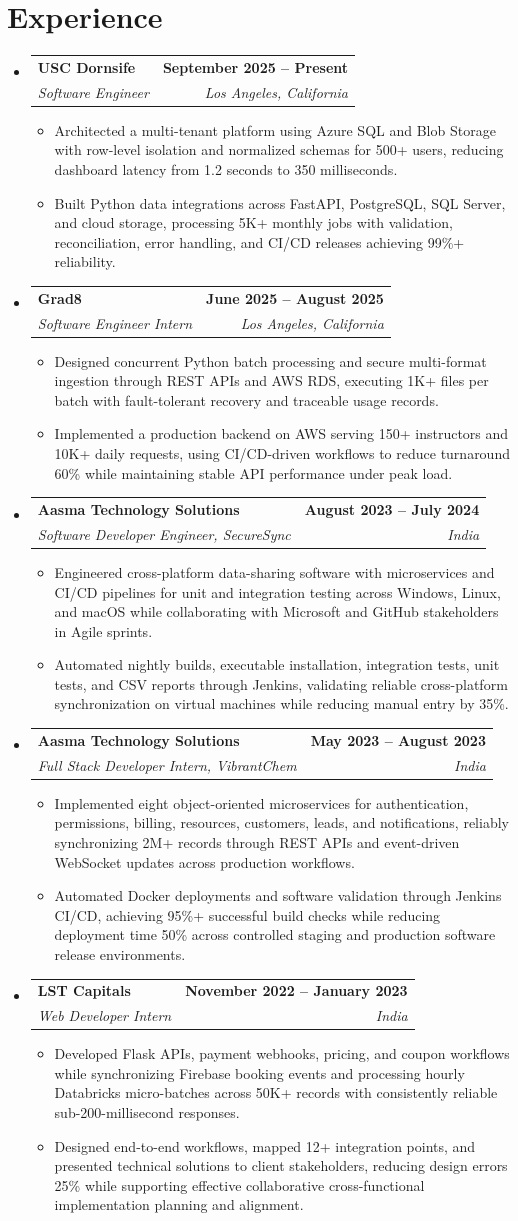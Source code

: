 \documentclass[letterpaper,10pt]{article}
\makeatletter
\newcommand{\itemTail}{\vspace{-4pt}}
\newcommand{\sectionGap}{\vspace{-8pt}}
\newcommand{\roleGap}{\vspace{2pt}}
\newcommand{\resumeItem}[1]{\item\small{{#1 \itemTail}}}
\newcommand{\resumeSubheading}[4]{\vspace{-1pt}\item\begin{tabular*}{1.0\textwidth}[t]{l@{\extracolsep{\fill}}r}\textbf{#1} & \textbf{\small #2} \\\textit{\small#3} & \textit{\small #4} \\\end{tabular*}\vspace{-2pt}}
\newcommand{\resumeSubHeadingListStart}{\begin{itemize}[leftmargin=0.0in, label={}]}
\newcommand{\resumeSubHeadingListEnd}{\end{itemize}}
\newcommand{\resumeItemListStart}{\begin{itemize}[leftmargin=0.15in,label=\textbullet,itemsep=3pt,topsep=0pt,parsep=0pt,partopsep=0pt]}
\newcommand{\resumeItemListEnd}{\end{itemize}\vspace{-4pt}}
\makeatother
\begin{document}
\section{Experience}
\resumeSubHeadingListStart
\resumeSubheading{USC Dornsife}{September 2025 -- Present}{Software Engineer}{Los Angeles, California}
\resumeItemListStart
\resumeItem{Architected a multi-tenant platform using Azure SQL and Blob Storage with row-level isolation and normalized schemas for 500+ users, reducing dashboard latency from 1.2 seconds to 350 milliseconds.}
\resumeItem{Built Python data integrations across FastAPI, PostgreSQL, SQL Server, and cloud storage, processing 5K+ monthly jobs with validation, reconciliation, error handling, and CI/CD releases achieving 99\%+ reliability.}
\resumeItemListEnd
\roleGap
\resumeSubheading{Grad8}{June 2025 -- August 2025}{Software Engineer Intern}{Los Angeles, California}
\resumeItemListStart
\resumeItem{Designed concurrent Python batch processing and secure multi-format ingestion through REST APIs and AWS RDS, executing 1K+ files per batch with fault-tolerant recovery and traceable usage records.}
\resumeItem{Implemented a production backend on AWS serving 150+ instructors and 10K+ daily requests, using CI/CD-driven workflows to reduce turnaround 60\% while maintaining stable API performance under peak load.}
\resumeItemListEnd
\roleGap
\resumeSubheading{Aasma Technology Solutions}{August 2023 -- July 2024}{Software Developer Engineer, SecureSync}{India}
\resumeItemListStart
\resumeItem{Engineered cross-platform data-sharing software with microservices and CI/CD pipelines for unit and integration testing across Windows, Linux, and macOS while collaborating with Microsoft and GitHub stakeholders in Agile sprints.}
\resumeItem{Automated nightly builds, executable installation, integration tests, unit tests, and CSV reports through Jenkins, validating reliable cross-platform synchronization on virtual machines while reducing manual entry by 35\%.}
\resumeItemListEnd
\roleGap
\resumeSubheading{Aasma Technology Solutions}{May 2023 -- August 2023}{Full Stack Developer Intern, VibrantChem}{India}
\resumeItemListStart
\resumeItem{Implemented eight object-oriented microservices for authentication, permissions, billing, resources, customers, leads, and notifications, reliably synchronizing 2M+ records through REST APIs and event-driven WebSocket updates across production workflows.}
\resumeItem{Automated Docker deployments and software validation through Jenkins CI/CD, achieving 95\%+ successful build checks while reducing deployment time 50\% across controlled staging and production software release environments.}
\resumeItemListEnd
\roleGap
\resumeSubheading{LST Capitals}{November 2022 -- January 2023}{Web Developer Intern}{India}
\resumeItemListStart
\resumeItem{Developed Flask APIs, payment webhooks, pricing, and coupon workflows while synchronizing Firebase booking events and processing hourly Databricks micro-batches across 50K+ records with consistently reliable sub-200-millisecond responses.}
\resumeItem{Designed end-to-end workflows, mapped 12+ integration points, and presented technical solutions to client stakeholders, reducing design errors 25\% while supporting effective collaborative cross-functional implementation planning and alignment.}
\resumeItemListEnd
\resumeSubHeadingListEnd
\sectionGap
\end{document}
